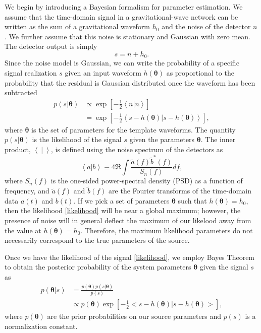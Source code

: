 \documentclass[11pt,a4paper]{emulateapj} 
\newcommand{\thpara}{\boldsymbol{\theta}}
\begin{document}
We begin by introducing a Bayesian formalism for parameter estimation.
We assume that the time-domain signal in a gravitational-wave network
can be written as the sum of a gravitational waveform $h_0$ and
the noise of the detector $n$.  We further assume that this noise is
stationary and Gaussian with zero mean.  The detector output is simply
\begin{equation}
s = n + h_0 .
\label{SignalAddition}
\end{equation}
Since the noise model is Gaussian, we can write the probability of a
specific signal realization $s$ given an input waveform $h(\thpara)$ as
proportional to the probability that the residual is Gaussian
distributed once the waveform has been subtracted
\begin{align}
  p(s | \thpara) &\propto \exp\left[-\frac{1}{2}\left<n|n
    \right>\right] \nonumber \\ &= \exp\left[-\frac{1}{2}\left < s -
    h(\thpara) | s-h(\thpara)\right >\right] ,
  \label{likelihood}
\end{align}
where $\thpara$ is the set of parameters for the template waveforms.
The quantity $p(s | \thpara)$ is the likelihood of the signal $s$
given the parameters $\thpara$.  The inner product, $\left< ~|~
\right> $, is defined using the noise spectrum of the detectors as
\begin{equation}
  \left<a|b\right> \equiv 4 \Re \int
  \frac{\tilde{a}(f)\tilde{b}^*(f)}{S_n(f)} df ,
  \label{innerProduct}
\end{equation}
where $S_n(f)$ is the one-sided power-spectral density (PSD) as a
function of frequency, and $\tilde{a}(f)$ and $\tilde{b}(f)$ are the
Fourier transforms of the time-domain data $a(t)$ and $b(t)$.  If we
pick a set of parameters $\thpara$ such that $h(\thpara) = h_0$, then
the likelihood \eqref{likelihood} will be near a global maximum;
however, the presence of noise will in general deflect the maximum of
our likelood away from the value at $h(\thpara) = h_0$.  Therefore, the
maximum likelihood parameters do not necessarily correspond to the true
parameters of the source.
 
Once we have the likelihood of the signal \eqref{likelihood}, we
employ Bayes Theorem to obtain the posterior probability of the system
parameters $\thpara$ given the signal $s$ as
\begin{align}
  p(\thpara | s) &= \frac{p(\thpara)p(s | \thpara)}{p(s)}
  \nonumber\\ & \propto p(\thpara) \exp\left[-\frac{1}{2}\big < s -
    h(\thpara) | s-h(\thpara) \big > \right] ,
  \label{posterior}
\end{align}
where $p(\thpara)$ are the prior probabilities on our source
parameters and $p(s)$ is a normalization constant.
\end{document}

